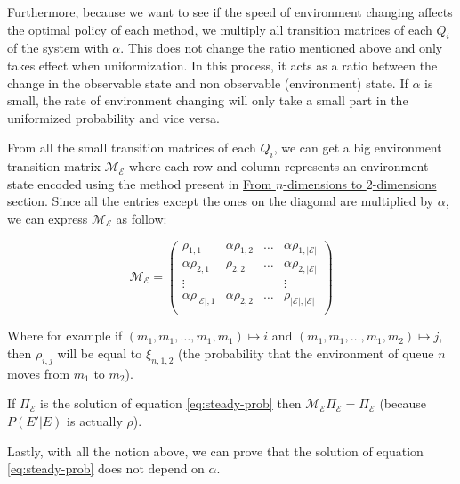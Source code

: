 \documentclass[
  a4paper, xcolor = usenames,dvipsnames]{article}
\theoremstyle{definition}
\theoremstyle{definition}
\theoremstyle{definition}
\theoremstyle{definition}
\theoremstyle{remark}
\begin{document}
Furthermore, because we want to see if the speed of environment changing affects the optimal policy of each method, we multiply all transition matrices of each \(Q_{i}\) of the system with \(\alpha\). This does not change the ratio mentioned above and only takes effect when uniformization. In this process, it acts as a ratio between the change in the observable state and non observable (environment) state. If \(\alpha\) is small, the rate of environment changing will only take a small part in the uniformized probability and vice versa.

From all the small transition matrices of each \(Q_{i}\), we can get a big environment transition matrix \(\mathcal{M}_{\mathcal{E}}\) where each row and column represents an environment state encoded using the method present in \protect\hyperlink{from-n-dimensions-to-2-dimensions}{From \(n\)-dimensions to \(2\)-dimensions} section. Since all the entries except the ones on the diagonal are multiplied by \(\alpha\), we can express \(\mathcal{M}_{\mathcal{E}}\) as follow:

\[
\mathcal{M}_{\mathcal{E}} = \begin{pmatrix}
\rho_{1, 1} & \alpha \rho_{1, 2} & \dots & \alpha \rho_{1, |\mathcal{E}|} \\
\alpha \rho_{2, 1} & \rho_{2, 2} & \dots & \alpha \rho_{2, |\mathcal{E}|} \\
\vdots & & & \vdots \\
\alpha \rho_{|\mathcal{E}|, 1} & \alpha \rho_{2, 2} & \dots & \rho_{|\mathcal{E}|, |\mathcal{E}|} \\
\end{pmatrix}
\]

Where for example if \((m_{1}, m_{1}, \dots, m_{1}, m_{1}) \mapsto i\) and \((m_{1}, m_{1}, \dots, m_{1}, m_{2}) \mapsto j\), then \(\rho_{i, j}\) will be equal to \(\xi_{n, 1, 2}\) (the probability that the environment of queue \(n\) moves from \(m_{1}\) to \(m_{2}\)).

If \(\Pi_{\mathcal{E}}\) is the solution of equation \eqref{eq:steady-prob} then \(\mathcal{M}_{\mathcal{E}} \Pi_{\mathcal{E}} = \Pi_{\mathcal{E}}\) (because \(P(E' | E)\) is actually \(\rho\)).

Lastly, with all the notion above, we can prove that the solution of
equation \eqref{eq:steady-prob} does not depend on \(\alpha\).
\end{document}
